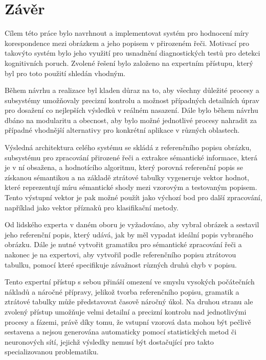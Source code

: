 \section{Závěr}
Cílem této práce bylo navrhnout a implementovat systém pro hodnocení míry korespondence mezi
obrázkem a jeho popisem v přirozeném řeči.
Motivací pro takovýto systém bylo jeho využití pro usnadnění diagnostických testů pro detekci kognitivních poruch.
Zvolené řešení bylo založeno na expertním přístupu, který byl pro toto použití shledán vhodným.

Během návrhu a realizace byl kladen důraz na to, aby všechny důležité procesy a subsystémy umožňovaly
precizní kontrolu a možnost případných detailních úprav pro dosažení co nejlepších výsledků v reálném nasazení.
Dále bylo během návrhu dbáno na modularitu a obecnost, aby bylo možné jednotlivé procesy nahradit
za případné vhodnější alternativy pro konkrétní aplikace v různých oblastech.

Výsledná architektura celého systému se skládá z referenčního popisu obrázku, subsystému pro zpracování přirozené
řeči a extrakce sémantické informace, která je v ní obsažena, a hodnotícího algoritmu,
který porovná referenční popis se získanou sémantikou a na základě ztrátové tabulky vygeneruje
vektor hodnot, které reprezentují míru sémantické shody mezi vzorovým a testovaným popisem.
Tento výstupní vektor je pak možné použít jako výchozí bod pro další zpracování, například jako vektor příznaků pro klasifikační metody.

Od lidského experta v daném oboru je vyžadováno, aby vybral obrázek a sestavil jeho referenční popis, který udává,
jak by měl vypadat ideální popis vybraného obrázku.
Dále je nutné vytvořit gramatiku pro sémantické zpracování řeči a nakonec je na expertovi, aby vytvořil podle referenčního popisu
ztrátovou tabulku, pomocí které specifikuje závažnost různých druhů chyb v popisu.

Tento expertní přístup s sebou přináší omezení ve smyslu vysokých počátečních nákladů a náročné přípravy,
jelikož tvorba referenčního popisu, gramatik a ztrátové tabulky může představovat časově náročný úkol.
Na druhou stranu ale zvolený přístup umožňuje velmi detailní a precizní kontrolu nad jednotlivými procesy a fázemi, právě
díky tomu, že vstupní vzorová data mohou být pečlivě sestavena a nejsou generována automaticky pomocí statistických metod či neuronových sítí,
jejichž výsledky nemusí být dostačující pro takto specializovanou problematiku.

